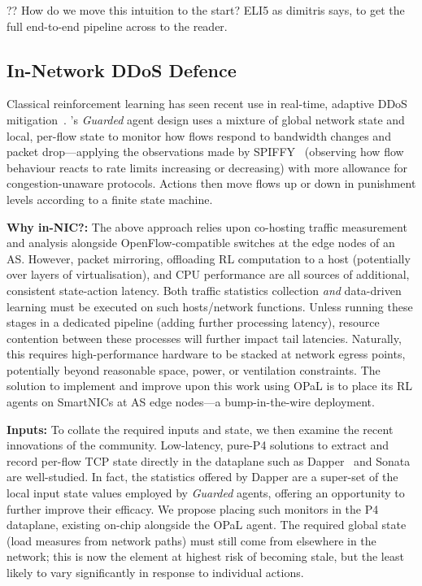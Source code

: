 \documentclass[
sigconf,natbib=false
]{acmart}
\newcommand{\fakepara}[1]{\noindent\textbf{#1:}}
\newcommand{\approachshort}{OPaL}
\begin{document}
?? How do we move this intuition to the start? ELI5 as dimitris says, to get the full end-to-end pipeline across to the reader.

\subsection{In-Network DDoS Defence}\label{sec:integ-1}
Classical reinforcement learning has seen recent use in real-time, adaptive DDoS mitigation~\parencite{DBLP:journals/tnsm/SimpsonRP20}.
's \emph{Guarded} agent design uses a mixture of global network state and local, per-flow state to monitor how flows respond to bandwidth changes and packet drop---applying the observations made by SPIFFY~\parencite{DBLP:conf/ndss/KangGS16} (observing how flow behaviour reacts to rate limits increasing or decreasing) with more allowance for congestion-unaware protocols.
Actions then move flows up or down in punishment levels according to a finite state machine.

\fakepara{Why in-NIC?}
The above approach relies upon co-hosting traffic measurement and analysis alongside OpenFlow-compatible switches at the edge nodes of an AS.
However, packet mirroring, offloading RL computation to a host (potentially over layers of virtualisation), and CPU performance are all sources of additional, consistent state-action latency.
Both traffic statistics collection \emph{and} data-driven learning must be executed on such hosts/network functions.
Unless running these stages in a dedicated pipeline (adding further processing latency), resource contention between these processes will further impact tail latencies.
Naturally, this requires high-performance hardware to be stacked at network egress points, potentially beyond reasonable space, power, or ventilation constraints.
The solution to implement and improve upon this work using \approachshort{} is to place its RL agents on SmartNICs at AS edge nodes---a bump-in-the-wire deployment.


\fakepara{Inputs}
To collate the required inputs and state, we then examine the recent innovations of the community.
Low-latency, pure-P4 solutions to extract and record per-flow TCP state directly in the dataplane such as Dapper~\parencite{DBLP:conf/sosr/GhasemiBR17} and Sonata~\parencite{DBLP:conf/sigcomm/GuptaHCFRW18} are well-studied.
In fact, the statistics offered by Dapper are a super-set of the local input state values employed by \emph{Guarded} agents, offering an opportunity to further improve their efficacy. 
We propose placing such monitors in the P4 dataplane, existing on-chip alongside the \approachshort{} agent.
The required global state (load measures from network paths) must still come from elsewhere in the network; this is now the element at highest risk of becoming stale, but the least likely to vary significantly in response to individual actions.
\end{document}
